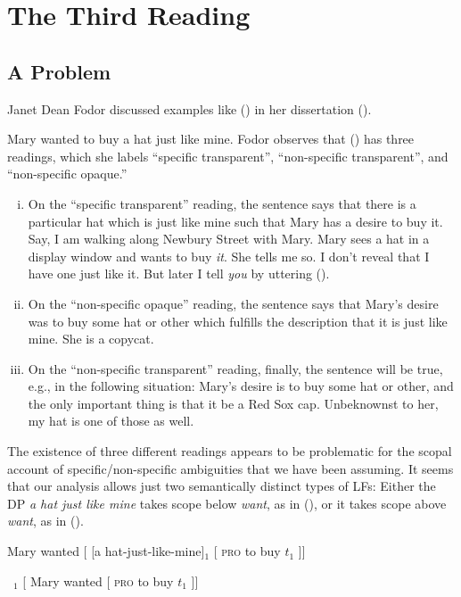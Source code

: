 \chapter{The Third Reading}\label{cha:the_third_reading} 

\minitoc

\section{A Problem}

Janet Dean Fodor discussed examples like (\nextx) in her dissertation
(\citeyear{fodor-1970-thesis}).

\ex Mary wanted to buy a hat just like mine. \xe
%
Fodor observes that (\lastx) has three readings, which she labels ``specific
transparent'', ``non-specific transparent'', and ``non-specific opaque.''

\begin{enumerate}[(i)] 
\item On the ``specific transparent'' reading, the sentence says that there is a
  particular hat which is just like mine such that Mary has a desire to buy it.
  Say, I am walking along Newbury Street with Mary. Mary sees a hat in a display
  window and wants to buy \emph{it}. She tells me so. I don't reveal that I have
  one just like it. But later I tell \emph{you} by uttering (\lastx).
\item On the ``non-specific opaque'' reading, the sentence says that Mary's
  desire was to buy some hat or other which fulfills the description that it is
  just like mine. She is a copycat.
\item On the ``non-specific transparent'' reading, finally, the sentence will be
  true, e.g., in the following situation: Mary's desire is to buy some hat or
  other, and the only important thing is that it be a Red Sox cap. Unbeknownst
  to her, my hat is one of those as well.
\end{enumerate}
%
The existence of three different readings appears to be problematic for the
scopal account of specific/non-specific ambiguities that we have been assuming.
It seems that our analysis allows just two semantically distinct types of LFs:
Either the DP \emph{a hat just like mine} takes scope below \emph{want}, as in
(\nextx), or it takes scope above \emph{want}, as in (\anextx).

\ex Mary wanted [ [a hat-just-like-mine]$_{1}$ [ \textsc{pro} to buy $t_{1}$ ]]
\xe

\ex~$_{1}$ [ Mary wanted [ \textsc{pro} to buy
$t_{1}$ ]] \xe

